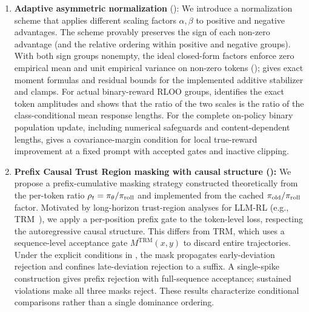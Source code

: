 \begin{enumerate}
    \item \textbf{Adaptive asymmetric normalization} (): We introduce a normalization scheme that applies different
    scaling factors $\alpha, \beta$ to positive and negative advantages. The scheme provably preserves the sign of each non-zero advantage
    (and the relative ordering within positive and negative groups). With both sign groups nonempty, the ideal closed-form factors
    enforce zero empirical mean and unit empirical variance on non-zero tokens
    ();  gives exact moment formulas and residual bounds for the
    implemented additive stabilizer and clamps. For actual binary-reward RLOO
    groups,  identifies the exact
    token amplitudes and shows that the ratio of the two scales is the ratio
    of the class-conditional mean response lengths.
    For the complete on-policy binary population update, including numerical
    safeguards and content-dependent lengths,
     gives a covariance-margin condition
    for local true-reward improvement at a fixed prompt with accepted gates
    and inactive clipping.

    \item \textbf{Prefix Causal Trust Region masking with causal structure ():} We propose a prefix-cumulative masking
    strategy constructed theoretically from the per-token ratio $\rho_t=\pi_{\theta}/\pi_{\mathrm{roll}}$ and implemented from the cached
    $\pi_{\mathrm{old}}/\pi_{\mathrm{roll}}$ factor. Motivated by long-horizon trust-region analyses for LLM-RL
    (e.g., TRM~\citep{li2025trm}), we apply a per-position prefix gate to the token-level loss, respecting the autoregressive causal
    structure. This differs from TRM, which uses a sequence-level acceptance gate $M^{\mathrm{TRM}}(x,y)$ to discard entire trajectories.
    Under the explicit conditions in , the mask propagates early-deviation rejection and confines late-deviation
    rejection to a suffix. A single-spike construction gives prefix rejection with full-sequence acceptance; sustained violations make
    all three masks reject. These results characterize conditional comparisons rather than a single dominance ordering.


\end{enumerate}
